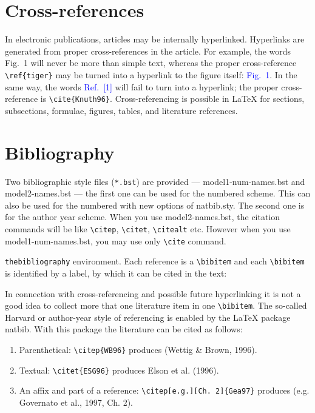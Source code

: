\documentclass[a4paper,fleqn]{cas-dc}
\begin{document}
\section{Cross-references}
In electronic publications, articles may be internally
hyperlinked. Hyperlinks are generated from proper
cross-references in the article.  For example, the words
\textcolor{black!80}{Fig.~1} will never be more than simple text,
whereas the proper cross-reference \verb+\ref{tiger}+ may be
turned into a hyperlink to the figure itself:
\textcolor{blue}{Fig.~1}.  In the same way,
the words \textcolor{blue}{Ref.~[1]} will fail to turn into a
hyperlink; the proper cross-reference is \verb+\cite{Knuth96}+.
Cross-referencing is possible in \LaTeX{} for sections,
subsections, formulae, figures, tables, and literature
references.

\section{Bibliography}

Two bibliographic style files (\verb+*.bst+) are provided ---
{model1-num-names.bst} and {model2-names.bst} --- the first one can be
used for the numbered scheme. This can also be used for the numbered
with new options of {natbib.sty}. The second one is for the author year
scheme. When  you use model2-names.bst, the citation commands will be
like \verb+\citep+,  \verb+\citet+, \verb+\citealt+ etc. However when
you use model1-num-names.bst, you may use only \verb+\cite+ command.

\verb+thebibliography+ environment.  Each reference is a\linebreak
\verb+\bibitem+ and each \verb+\bibitem+ is identified by a label,
by which it can be cited in the text:

\noindent In connection with cross-referencing and
possible future hyperlinking it is not a good idea to collect
more that one literature item in one \verb+\bibitem+.  The
so-called Harvard or author-year style of referencing is enabled
by the \LaTeX{} package {natbib}. With this package the
literature can be cited as follows:

\begin{enumerate}[\textbullet]
\item Parenthetical: \verb+\citep{WB96}+ produces (Wettig \& Brown, 1996).
\item Textual: \verb+\citet{ESG96}+ produces Elson et al. (1996).
\item An affix and part of a reference:\break
\verb+\citep[e.g.][Ch. 2]{Gea97}+ produces (e.g. Governato et
al., 1997, Ch. 2).
\end{enumerate}
\end{document}

